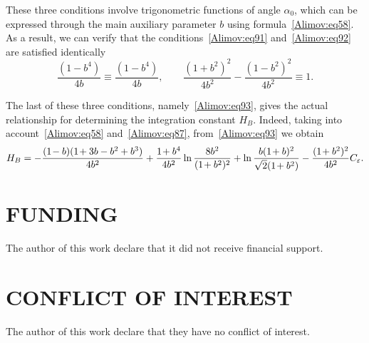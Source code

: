 \documentclass[
11pt,%
tightenlines,%
twoside,%
onecolumn,%
nofloats,%
nobibnotes,%
nofootinbib,%
superscriptaddress,%
noshowpacs,%
centertags]%
{revtex4-2}
\begin{document}
These three conditions involve trigonometric functions of angle $\alpha_0$, which can be expressed
through the main auxiliary parameter $b$ using formula~\eqref{Alimov:eq58}. As a result, we can
verify that the conditions~\eqref{Alimov:eq91} and~\eqref{Alimov:eq92} are satisfied identically
\[
\frac{(1 - b^4)}{4b} \equiv \frac{(1 - b^4)}{4b}, \quad \quad \frac{(1 + b^2)^2}{4b^2} - \frac{(1 -
b^2)^2}{4b^2} \equiv 1.
\]

The last of these three conditions, namely~\eqref{Alimov:eq93}, gives the actual relationship for
determining the integration constant $H_B$. Indeed, taking into account~\eqref{Alimov:eq58}
and~\eqref{Alimov:eq87}, from~\eqref{Alimov:eq93} we obtain
\[
 H_B = - \frac{(1\hspace{-0.5mm} - b)(1\hspace{-0.5mm} + 3b - b^2 + b^3)}{4b^2} +
\frac{1\hspace{-0.5mm} + b^4}{4b^2}\ln \frac{8b^2}{(1\hspace{-0.5mm} + b^2)^2} + \ln
\frac{b(1\hspace{-0.5mm} + b)^2}{\sqrt 2 (1\hspace{-0.5mm} + b^2)} - \frac{(1\hspace{-0.5mm} +
b^2)^2}{4b^2}C_\varepsilon.
\]
\section*{FUNDING}
The author of this work declare that it did not receive financial support.

\section*{CONFLICT OF INTEREST}
The author of this work declare that they have no conflict of interest.
\end{document}
